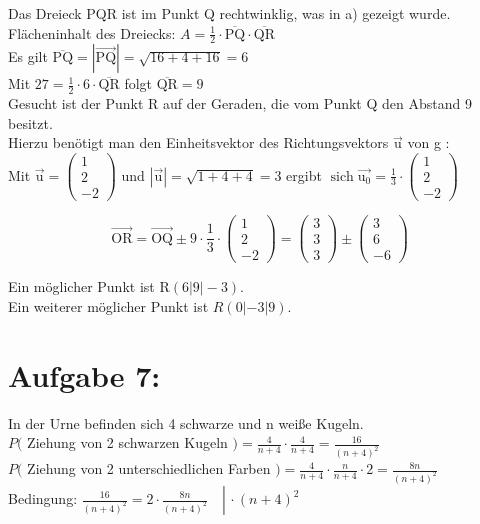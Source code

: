 \documentclass[10pt]{article}
\begin{document}
Das Dreieck PQR ist im Punkt Q rechtwinklig, was in a) gezeigt wurde.\\
Flächeninhalt des Dreiecks: $A=\frac{1}{2} \cdot \overline{\mathrm{PQ}} \cdot \overline{\mathrm{QR}}$\\
Es gilt $\overline{\mathrm{PQ}}=|\overrightarrow{\mathrm{PQ}}|=\sqrt{16+4+16}=6$\\
Mit $27=\frac{1}{2} \cdot 6 \cdot \overline{\mathrm{QR}}$ folgt $\overline{\mathrm{QR}}=9$\\
Gesucht ist der Punkt R auf der Geraden, die vom Punkt Q den Abstand 9 besitzt.\\
Hierzu benötigt man den Einheitsvektor des Richtungsvektors $\overrightarrow{\mathrm{u}}$ von g :\\
Mit $\overrightarrow{\mathrm{u}}=\left(\begin{array}{c}1 \\ 2 \\ -2\end{array}\right)$ und $|\overrightarrow{\mathrm{u}}|=\sqrt{1+4+4}=3$ ergibt $\operatorname{sich} \overrightarrow{\mathrm{u}_{0}}=\frac{1}{3} \cdot\left(\begin{array}{c}1 \\ 2 \\ -2\end{array}\right)$

$$
\overrightarrow{\mathrm{OR}}=\overrightarrow{\mathrm{OQ}} \pm 9 \cdot \frac{1}{3} \cdot\left(\begin{array}{c}
1 \\
2 \\
-2
\end{array}\right)=\left(\begin{array}{l}
3 \\
3 \\
3
\end{array}\right) \pm\left(\begin{array}{c}
3 \\
6 \\
-6
\end{array}\right)
$$

Ein möglicher Punkt ist $\mathrm{R}(6|9|-3)$.\\
Ein weiterer möglicher Punkt ist $R(0|-3| 9)$.

\section*{Aufgabe 7:}
In der Urne befinden sich 4 schwarze und n weiße Kugeln.\\
$P($ Ziehung von 2 schwarzen Kugeln $)=\frac{4}{n+4} \cdot \frac{4}{n+4}=\frac{16}{(n+4)^{2}}$\\
$P($ Ziehung von 2 unterschiedlichen Farben $)=\frac{4}{n+4} \cdot \frac{n}{n+4} \cdot 2=\frac{8 n}{(n+4)^{2}}$\\
Bedingung: $\left.\frac{16}{(n+4)^{2}}=2 \cdot \frac{8 n}{(n+4)^{2}} \quad \right\rvert\, \cdot(n+4)^{2}$
\end{document}
